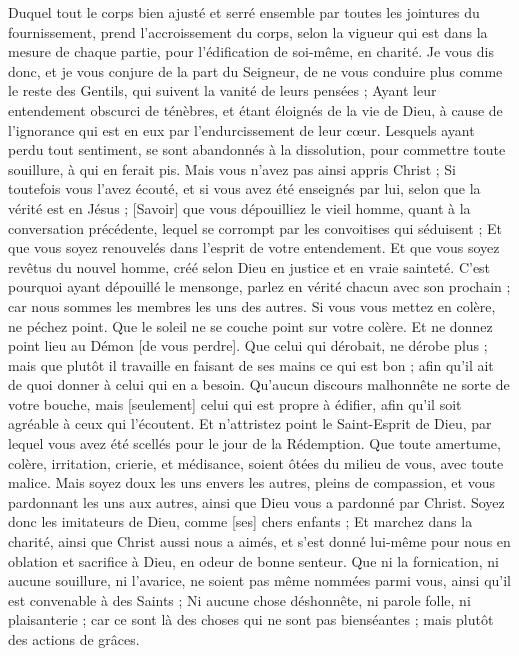 \begin{multicols}{2}
Duquel tout le corps bien ajusté et serré ensemble par toutes les jointures du fournissement, prend l'accroissement du corps, selon la vigueur qui est dans la mesure de chaque partie, pour l'édification de soi-même, en charité.
Je vous dis donc, et je vous conjure de la part du Seigneur, de ne vous conduire plus comme le reste des Gentils, qui suivent la vanité de leurs pensées ;
Ayant leur entendement obscurci de ténèbres, et étant éloignés de la vie de Dieu, à cause de l'ignorance qui est en eux par l'endurcissement de leur cœur.
Lesquels ayant perdu tout sentiment, se sont abandonnés à la dissolution, pour commettre toute souillure, à qui en ferait pis.
Mais vous n'avez pas ainsi appris Christ ;
Si toutefois vous l'avez écouté, et si vous avez été enseignés par lui, selon que la vérité est en Jésus ;
[Savoir] que vous dépouilliez le vieil homme, quant à la conversation précédente, lequel se corrompt par les convoitises qui séduisent ;
Et que vous soyez renouvelés dans l'esprit de votre entendement.
Et que vous soyez revêtus du nouvel homme, créé selon Dieu en justice et en vraie sainteté.
C'est pourquoi ayant dépouillé le mensonge, parlez en vérité chacun avec son prochain ; car nous sommes les membres les uns des autres.
Si vous vous mettez en colère, ne péchez point. Que le soleil ne se couche point sur votre colère.
Et ne donnez point lieu au Démon [de vous perdre].
Que celui qui dérobait, ne dérobe plus ; mais que plutôt il travaille en faisant de ses mains ce qui est bon ; afin qu'il ait de quoi donner à celui qui en a besoin.
Qu'aucun discours malhonnête ne sorte de votre bouche, mais [seulement] celui qui est propre à édifier, afin qu'il soit agréable à ceux qui l'écoutent.
Et n'attristez point le Saint-Esprit de Dieu, par lequel vous avez été scellés pour le jour de la Rédemption.
Que toute amertume, colère, irritation, crierie, et médisance, soient ôtées du milieu de vous, avec toute malice.
Mais soyez doux les uns envers les autres, pleins de compassion, et vous pardonnant les uns aux autres, ainsi que Dieu vous a pardonné par Christ.
\VerseOne{}Soyez donc les imitateurs de Dieu, comme [ses] chers enfants ;
Et marchez dans la charité, ainsi que Christ aussi nous a aimés, et s'est donné lui-même pour nous en oblation et sacrifice à Dieu, en odeur de bonne senteur.
Que ni la fornication, ni aucune souillure, ni l'avarice, ne soient pas même nommées parmi vous, ainsi qu’il est convenable à des Saints ;
Ni aucune chose déshonnête, ni parole folle, ni plaisanterie ; car ce sont là des choses qui ne sont pas bienséantes ; mais plutôt des actions de grâces.

\end{multicols}
